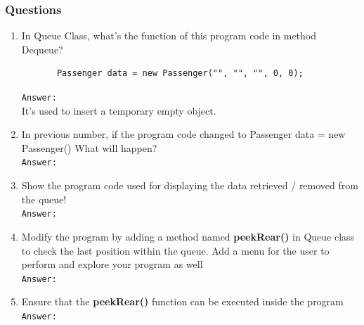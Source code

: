 \documentclass[12pt,titlepage]{article}
\begin{document}
\subsubsection{Questions}
\begin{enumerate}
    \item In Queue Class, what’s the function of this program code in method Dequeue?
    \begin{verbatim}
       Passenger data = new Passenger("", "", "", 0, 0);
    \end{verbatim}
    \texttt{Answer: }
    \mbox{}\\
    It's used to insert a temporary empty object.
    \item In previous number, if the program code changed to Passenger data = new Passenger() What will happen?
    \mbox{}\\
    \texttt{Answer: }
    \mbox{}\\
    \item Show the program code used for displaying the data retrieved / removed from the queue!
    \mbox{}\\
    \texttt{Answer: }
    \mbox{}\\
    \item Modify the program by adding a method named \textbf{peekRear()} in Queue class to check the last position within the queue. Add a menu for the user to perform and explore your program as well
    \mbox{}\\
    \texttt{Answer: }
    \mbox{}\\
    \item Ensure that the \textbf{peekRear()} function can be executed inside the program
    \mbox{}\\
    \texttt{Answer: }
    \mbox{}\\
\end{enumerate}
\end{document}
